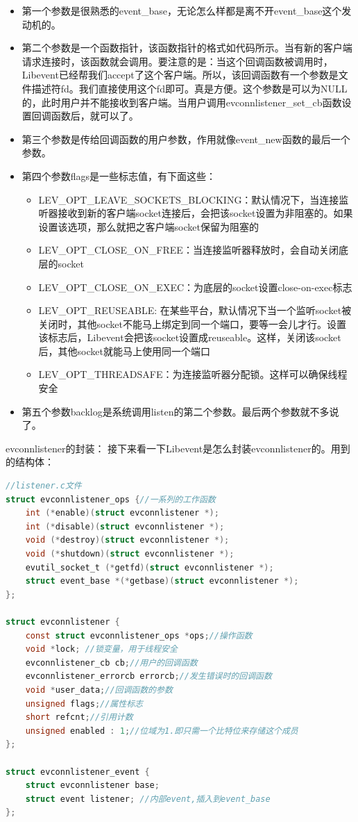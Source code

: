 \documentclass[11pt,a4paper]{article}
\begin{document}
\begin{itemize}
\item 第一个参数是很熟悉的event\_base，无论怎么样都是离不开event\_base这个发动机的。
\item 第二个参数是一个函数指针，该函数指针的格式如代码所示。当有新的客户端请求连接时，该函数就会调用。要注意的是：当这个回调函数被调用时，Libevent已经帮我们accept了这个客户端。所以，该回调函数有一个参数是文件描述符fd。我们直接使用这个fd即可。真是方便。这个参数是可以为NULL的，此时用户并不能接收到客户端。当用户调用evconnlistener\_set\_cb函数设置回调函数后，就可以了。
\item 第三个参数是传给回调函数的用户参数，作用就像event\_new函数的最后一个参数。
\item 第四个参数flags是一些标志值，有下面这些：
	\begin{itemize}
	\item LEV\_OPT\_LEAVE\_SOCKETS\_BLOCKING：默认情况下，当连接监听器接收到新的客户端socket连接后，会把该socket设置为非阻塞的。如果设置该选项，那么就把之客户端socket保留为阻塞的
	\item LEV\_OPT\_CLOSE\_ON\_FREE：当连接监听器释放时，会自动关闭底层的socket
	\item LEV\_OPT\_CLOSE\_ON\_EXEC：为底层的socket设置close-on-exec标志
	\item LEV\_OPT\_REUSEABLE: 在某些平台，默认情况下当一个监听socket被关闭时，其他socket不能马上绑定到同一个端口，要等一会儿才行。设置该标志后，Libevent会把该socket设置成reuseable。这样，关闭该socket后，其他socket就能马上使用同一个端口
	\item LEV\_OPT\_THREADSAFE：为连接监听器分配锁。这样可以确保线程安全
	\end{itemize}
\item 第五个参数backlog是系统调用listen的第二个参数。最后两个参数就不多说了。
\end{itemize}

evconnlistener的封装：
        接下来看一下Libevent是怎么封装evconnlistener的。用到的结构体：
\begin{lstlisting}[language=C]
//listener.c文件
struct evconnlistener_ops {//一系列的工作函数
	int (*enable)(struct evconnlistener *);
	int (*disable)(struct evconnlistener *);
	void (*destroy)(struct evconnlistener *);
	void (*shutdown)(struct evconnlistener *);
	evutil_socket_t (*getfd)(struct evconnlistener *);
	struct event_base *(*getbase)(struct evconnlistener *);
};

struct evconnlistener {
	const struct evconnlistener_ops *ops;//操作函数
	void *lock; //锁变量，用于线程安全
	evconnlistener_cb cb;//用户的回调函数
	evconnlistener_errorcb errorcb;//发生错误时的回调函数
	void *user_data;//回调函数的参数
	unsigned flags;//属性标志
	short refcnt;//引用计数
	unsigned enabled : 1;//位域为1.即只需一个比特位来存储这个成员
};

struct evconnlistener_event {
	struct evconnlistener base;
	struct event listener; //内部event,插入到event_base
};
\end{lstlisting}
\end{document}
